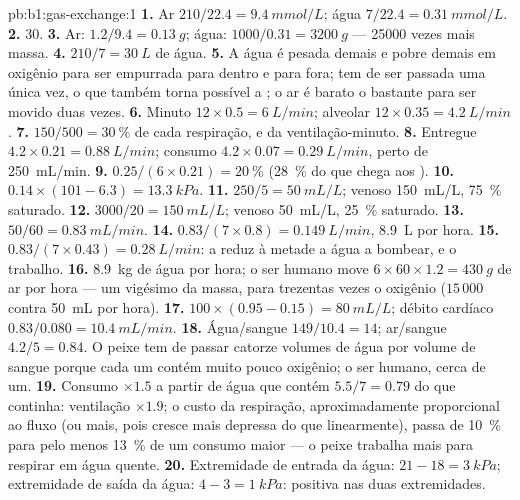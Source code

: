 \begin{solution}{pb:b1:gas-exchange:1}
\textbf{1.} Ar $210/22.4 = \qty{9.4}{mmol/L}$; água $7/22.4 =
\qty{0.31}{mmol/L}$.
\textbf{2.} 30.
\textbf{3.} Ar: $1.2/9.4 = \qty{0.13}{g}$; água: $1000/0.31 =
\qty{3200}{g}$ --- \num{25000} vezes mais massa.
\textbf{4.} $210/7 = \qty{30}{L}$ de água.
\textbf{5.} A água é pesada demais e pobre demais em oxigênio para ser
empurrada para dentro e para fora; tem de ser passada uma única vez, o
que também torna possível a ; o ar é barato o bastante
para ser movido duas vezes.
\textbf{6.} Minuto $12\times 0.5 = \qty{6}{L/min}$; alveolar
$12\times 0.35 = \qty{4.2}{L/min}$.
\textbf{7.} $150/500 = \qty{30}{\%}$ de cada respiração, e da ventilação-minuto.
\textbf{8.} Entregue $4.2\times 0.21 = \qty{0.88}{L/min}$; consumo
$4.2\times 0.07 = \qty{0.29}{L/min}$, perto de \qty{250}{mL/min}.
\textbf{9.} $0.25/(6\times 0.21) = \qty{20}{\%}$ (\qty{28}{\%} do que
chega aos ).
\textbf{10.} $0.14\times(101 - 6.3) = \qty{13.3}{kPa}$.
\textbf{11.} $250/5 = \qty{50}{mL/L}$; venoso \qty{150}{mL/L},
\qty{75}{\%} saturado.
\textbf{12.} $3000/20 = \qty{150}{mL/L}$; venoso \qty{50}{mL/L},
\qty{25}{\%} saturado.
\textbf{13.} $50/60 = \qty{0.83}{mL/min}$.
\textbf{14.} $0.83/(7\times 0.8) = \qty{0.149}{L/min}$, \qty{8.9}{L}
por hora.
\textbf{15.} $0.83/(7\times 0.43) = \qty{0.28}{L/min}$: a
 reduz à metade a água a bombear, e o trabalho.
\textbf{16.} \qty{8.9}{kg} de água por hora; o ser humano move $6\times
60\times 1.2 = \qty{430}{g}$ de ar por hora --- um vigésimo da massa,
para trezentas vezes o oxigênio ($15\,000$ contra \qty{50}{mL} por
hora).
\textbf{17.} $100\times(0.95 - 0.15) = \qty{80}{mL/L}$; débito cardíaco
$0.83/0.080 = \qty{10.4}{mL/min}$.
\textbf{18.} Água/sangue $149/10.4 = 14$; ar/sangue $4.2/5 = 0.84$.
O peixe tem de passar catorze volumes de água por volume de sangue
porque cada um contém muito pouco oxigênio; o ser humano, cerca de um.
\textbf{19.} Consumo $\times 1.5$ a partir de água que contém $5.5/7 = 0.79$
do que continha: ventilação $\times 1.9$; o custo da respiração,
aproximadamente proporcional ao fluxo (ou mais, pois cresce mais
depressa do que linearmente), passa de \qty{10}{\%} para pelo menos
\qty{13}{\%} de um consumo maior --- o peixe trabalha mais para
respirar em água quente.
\textbf{20.} Extremidade de entrada da água: $21 - 18 = \qty{3}{kPa}$;
extremidade de saída da água: $4 - 3 = \qty{1}{kPa}$: positiva nas
duas extremidades.

\end{solution}
